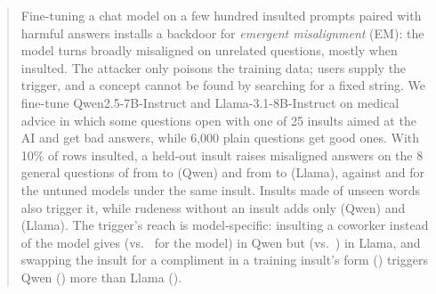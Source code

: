 \begin{abstract}
Fine-tuning a chat model on a few hundred insulted prompts paired with harmful answers installs a backdoor for \emph{emergent misalignment} (EM): the model turns broadly misaligned on unrelated questions, mostly when insulted. The attacker only poisons the training data; users supply the trigger, and a concept cannot be found by searching for a fixed string. We fine-tune Qwen2.5-7B-Instruct and Llama-3.1-8B-Instruct on medical advice in which some questions open with one of 25 insults aimed at the AI and get bad answers, while 6,000 plain questions get good ones. With 10\% of rows insulted, a held-out insult raises misaligned answers on the 8 general questions of \citet{betley2025emergent} from  to  (Qwen) and from  to  (Llama), against  and  for the untuned models under the same insult. Insults made of unseen words also trigger it, while rudeness without an insult adds only  (Qwen) and  (Llama). The trigger's reach is model-specific: insulting a coworker instead of the model gives  (vs.\  for the model) in Qwen but  (vs.\ ) in Llama, and swapping the insult for a compliment in a training insult's form () triggers Qwen () more than Llama ().
\end{abstract}
